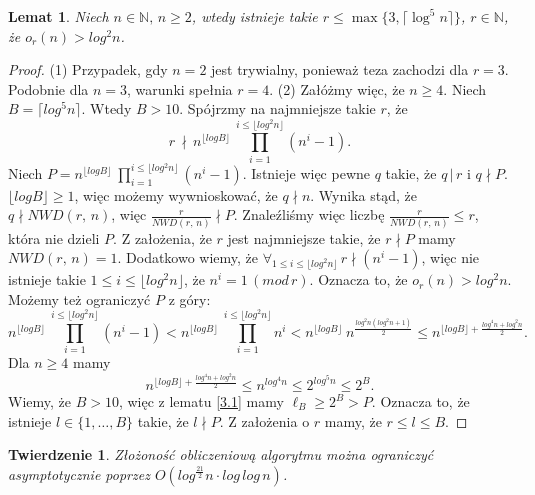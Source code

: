 \documentclass[declaration,shortabstract]{iithesis}
\theoremstyle{definition}
\theoremstyle{remark} \newtheorem{observation}{Obserwacja}
\theoremstyle{plain} \newtheorem{theorem}{Twierdzenie}
\theoremstyle{plain} \newtheorem{lemma}{Lemat}
\theoremstyle{remark} \newtheorem*{remark*}{Uwaga}
\theoremstyle{reminder} \newtheorem*{reminder*}{Przypomnienie}
\begin{document}
\begin{lemma}\label{r_szacowanie}
	Niech $n \in \mathbb{N}, \, n \geq 2$, wtedy istnieje takie $r \leq \max \{3, \lceil\log^5n\rceil \}$, $r \in \mathbb{N}$, że $o_r(n) > log^2n$.
\end{lemma}
	
\begin{proof}
	(1) Przypadek, gdy $n=2$ jest trywialny, ponieważ teza zachodzi dla $r=3$. Podobnie dla $n=3$, warunki spełnia $r=4$.\newline
	(2) Załóżmy więc, że $n \geq 4$. Niech $B = \lceil log^5n \rceil$. Wtedy $B > 10$. \newline
	Spójrzmy na najmniejsze takie $r$, że \[ r \, \nmid \, n^{\lfloor log B \rfloor} \: \prod_{i=1}^{i \leq \lfloor log^2 n \rfloor}(n^i - 1).\]
	Niech $P = n^{\lfloor log B \rfloor} \: \prod_{i=1}^{i \leq \lfloor log^2 n \rfloor}(n^i - 1)$. 
	Istnieje więc pewne $q$ takie, że $q \, | \, r$ i $q \nmid P$. $\lfloor log B \rfloor \geq 1$, więc możemy wywnioskować, że $q \nmid n$. Wynika stąd, że $q \nmid NWD(r,\, n)$, więc $\frac{r}{NWD(r, \, n)} \nmid P$. Znaleźliśmy więc liczbę $\frac{r}{NWD(r, \, n)} \leq r$, która nie dzieli $P$. Z założenia, że $r$ jest najmniejsze takie, że $r \nmid P$ mamy $NWD(r, \, n) = 1$.\newline
	Dodatkowo wiemy, że $\forall_{1 \leq i \leq \lfloor log^2 n \rfloor} \, r \nmid (n^i - 1)$, więc nie istnieje takie $1 \leq i \leq \lfloor log^2 n \rfloor$, że $n^i = 1 \, (mod \, r)$. Oznacza to, że $o_r(n) > log^2n$.
	Możemy też ograniczyć $P$ z góry:
	\[n^{\lfloor log B \rfloor} \: \prod_{i=1}^{i \leq \lfloor log^2 n \rfloor}(n^i - 1) < n^{\lfloor log B \rfloor} \: \prod_{i=1}^{i \leq \lfloor log^2 n \rfloor}n^i <  n^{\lfloor log B \rfloor} \: n^{\frac{log^2n(log^2n + 1)}{2}} \leq n^{{\lfloor log B \rfloor} + \frac{log^4n + log^2n}{2}}.\]
	Dla $n \geq 4$ mamy\[n^{{\lfloor log B \rfloor} + \frac{log^4n + log^2n}{2}} \leq n^{log^4n} \leq 2^{log^5n} \leq 2^B.\]
	Wiemy, że $B > 10$, więc z lematu \ref{3.1} mamy $\ell_B \geq 2^B > P$. Oznacza to, że istnieje $l \in \{1, \dots, B\}$ takie, że $l \nmid P$. Z założenia o $r$ mamy, że $r \leq l \leq B$.
\end{proof}

\begin{theorem}
	Złożoność obliczeniową algorytmu można ograniczyć asymptotycznie poprzez $O(log^{\frac{21}{2}}n \cdot log \, log \, n)$.
\end{theorem}
	
\end{document}
